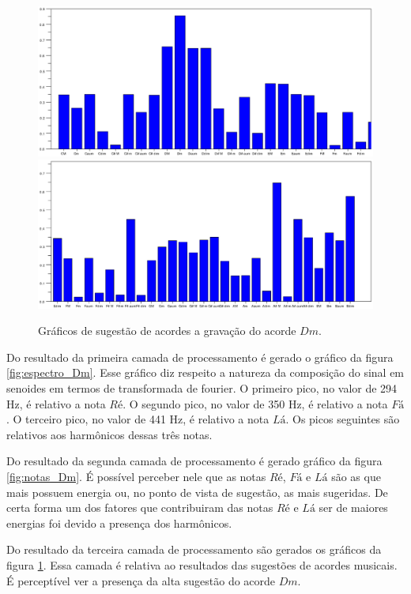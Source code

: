 \begin{figure}[h]
	\centering
		\includegraphics[keepaspectratio=true,scale=0.49]{figuras/Dm/acordes_1_Dm.eps}
		\includegraphics[keepaspectratio=true,scale=0.49]{figuras/Dm/acordes_2_Dm.eps}
	\caption{Gráficos de sugestão de acordes a gravação do acorde $Dm$.}
  \label{fig:acordes_Dm}
\end{figure}
\newpage

Do resultado da primeira camada de processamento é gerado o gráfico da figura \ref{fig:espectro_Dm}. Esse gráfico diz respeito a natureza da composição do sinal em senoides em termos de transformada de fourier. O primeiro pico, no valor de 294 Hz, é relativo a nota $Ré$. O segundo pico, no valor de 350 Hz, é relativo a nota $Fá$. O terceiro pico, no valor de 441 Hz, é relativo a nota $Lá$. Os picos seguintes são relativos aos harmônicos dessas três notas.

Do resultado da segunda camada de processamento é gerado gráfico da figura \ref{fig:notas_Dm}. É possível perceber nele que as notas $Ré$, $Fá$ e $Lá$ são as que mais possuem energia ou, no ponto de vista de sugestão, as mais sugeridas. De certa forma um dos fatores que contribuiram das notas $Ré$ e $Lá$ ser de maiores energias foi devido a presença dos harmônicos.

Do resultado da terceira camada de processamento são gerados os gráficos da figura \ref{fig:acordes_Dm}. Essa camada é relativa ao resultados das sugestões de acordes musicais. É perceptível ver a presença da alta sugestão do acorde $Dm$.

